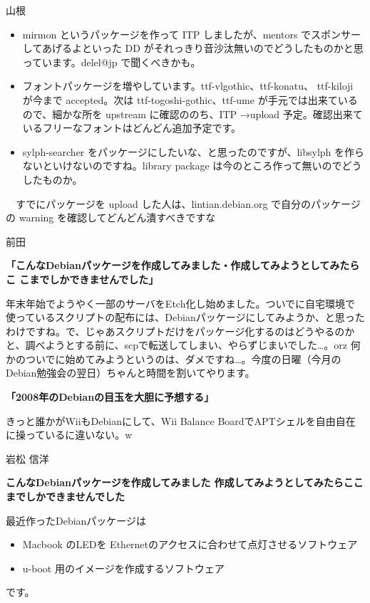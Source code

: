 \documentclass[cjk,dvipdfmx,12pt]{beamer}
\begin{document}
\begin{frame}{山根}
\begin{itemize}
 \item  mirmon というパッケージを作って ITP しましたが、mentors でスポンサーしてあげるよといった DD がそれっきり音沙汰無いのでどうしたものかと思っています。delel@jp で聞くべきかも。
 \item  フォントパッケージを増やしています。ttf-vlgothic、ttf-konatu、
	ttf-kiloji が今まで accepted。次は ttf-togoshi-gothic、ttf-ume
	が手元では出来ているので、細かな所を upstream に確認ののち、ITP
	→upload 予定。確認出来ているフリーなフォントはどんどん追加予定です。
 \item  sylph-searcher をパッケージにしたいな、と思ったのですが、libsylph を作らないといけないのですね。library package は今のところ作って無いのでどうしたものか。
\end{itemize}

　すでにパッケージを upload した人は、lintian.debian.org で自分のパッケージの warning を確認してどんどん潰すべきですな


\end{frame}\begin{frame}{前田}


\textbf{「こんなDebianパッケージを作成してみました・作成してみようとしてみたらこ
こまでしかできませんでした」}

年末年始でようやく一部のサーバをEtch化し始めました。ついでに自宅環境で使っているスクリプトの配布には、Debianパッケージにしてみようか、と思ったわけですね。で、じゃあスクリプトだけをパッケージ化するのはどうやるのかと、調べようとする前に、scpで転送してしまい、やらずじまいでした…。orz
何かのついでに始めてみようというのは、ダメですね…。今度の日曜（今月のDebian勉強会の翌日）ちゃんと時間を割いてやります。

\textbf{「2008年のDebianの目玉を大胆に予想する」}

きっと誰かがWiiもDebianにして、Wii Balance BoardでAPTシェルを自由自在に操っているに違いない。w

\end{frame}\begin{frame}{岩松 信洋}


\textbf{こんなDebianパッケージを作成してみました
  作成してみようとしてみたらここまでしかできませんでした}

最近作ったDebianパッケージは
\begin{itemize}
 \item  Macbook のLEDを Ethernetのアクセスに合わせて点灯させるソフトウェア
 \item  u-boot 用のイメージを作成するソフトウェア
\end{itemize}
です。


\end{frame}
\end{document}

